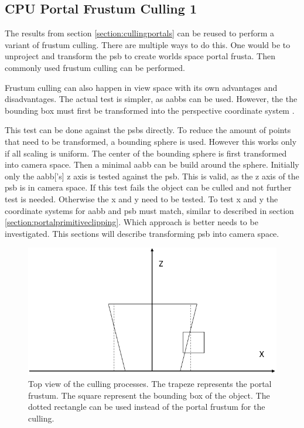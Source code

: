 \subsection{CPU Portal Frustum Culling 1}
The results from section \ref{section:cullingportals} can be reused to perform a variant of frustum culling. There are multiple ways to do this. One would be to unproject and transform the \gls{psb} to create worlds space portal frusta. Then commonly used frustum culling can be performed.

Frustum culling can also happen in view space  with its own advantages and disadvantages. The actual test is simpler, as \glspl{aabb} can be used. However, the the bounding box must first be transformed into the perspective coordinate system \cite{assarsson:2000:optimized}.


This test can be done against the \glspl{psb} directly. To reduce the amount of points that need to be transformed, a bounding sphere is used. However this works only if all scaling is uniform. The center of the bounding sphere is first transformed into camera space. Then a minimal \gls{aabb} can be build around the sphere. Initially only the \gls{aabb}['s] z axis is tested against the \gls{psb}. This is valid, as the z axis of the \gls{psb} is in camera space. If this test fails the object can be culled and not further test is needed. Otherwise the x and y need to be tested. To test x and y  the coordinate systems for \gls{aabb} and \gls{psb} must match, similar to described in section \ref{section:portalprimitiveclipping}. Which approach is better needs to be investigated. This sections will describe transforming \gls{psb} into camera space. 

\begin{figure}[h]
	\includegraphics[width=\linewidth]{images/frustumbox.png}
	\caption{Top view of the culling processes. The trapeze represents the portal frustum. The square represent the bounding box of the object. The dotted rectangle can be used instead of the portal frustum for the culling. }
	\label{fig:frustumbox}
\end{figure}

